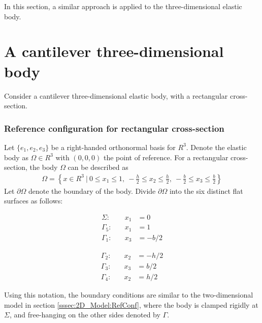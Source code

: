 \documentclass[../../main.tex]{subfiles}
\begin{document}
In this section, a similar approach is applied to the three-dimensional elastic body.


\section{A cantilever three-dimensional body}\label{sec:FEM:3D}
Consider a cantilever three-dimensional elastic body, with a rectangular cross-section.
 
\subsubsection{Reference configuration for rectangular cross-section}
Let $\{e_1,e_2,e_3\}$ be a right-handed orthonormal basis for $R^3$. Denote the elastic body as $\Omega \in R^3$ with $(0,0,0)$ the point of reference. For a rectangular cross-section, the body $\Omega$ can be described as
\begin{eqnarray*}
	\Omega = \left\{ x \in R^3 \ | \ 0 \leq x_1 \leq 1, \ -\frac{h}{2} \leq x_2 \leq \frac{h}{2} , \ -\frac{b}{2} \leq x_3 \leq \frac{b}{2}\right \}
\end{eqnarray*} \label{sim:width}
Let $\partial \Omega$ denote the boundary of the body. Divide $\partial \Omega$ into the six distinct flat surfaces as follows:

\noindent\begin{minipage}{.5\linewidth}
	\begin{eqnarray*}
		\Sigma:& \quad x_1 &= 0\\
		\Gamma_5:& \quad x_1 &= 1\\
		\Gamma_1:& \quad x_3 &= -{b}/{2} 
	\end{eqnarray*}
\end{minipage}%
\begin{minipage}{.5\linewidth}
	\begin{eqnarray*}
		\Gamma_2:& \quad x_2 &= -{h}/{2}\\
		\Gamma_3:& \quad x_3 &= {b}/{2}\\
		\Gamma_4:& \quad x_2 &= {h}/{2} 
	\end{eqnarray*}
\end{minipage}

Using this notation, the boundary conditions are similar to the two-dimensional model in section \ref{sssec:2D_Model:RefConf}, where the body is clamped rigidly at $\Sigma$, and free-hanging on the other sides denoted by $\Gamma$.
\end{document}
